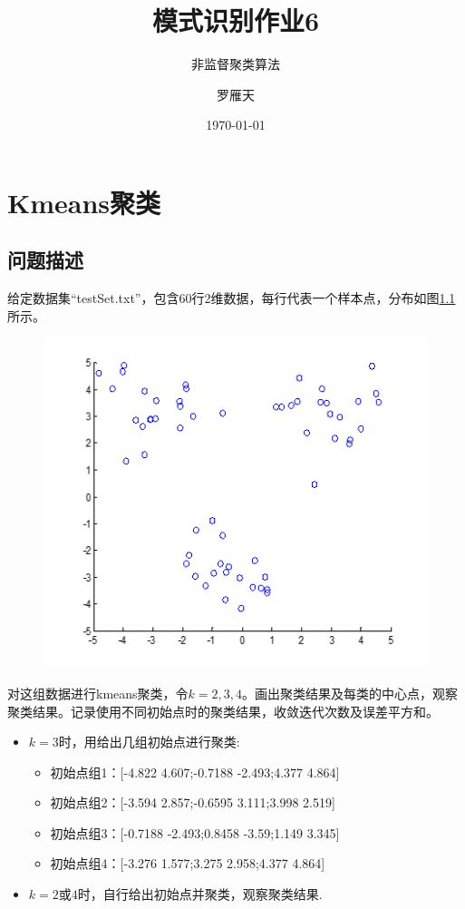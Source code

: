 \documentclass[cn]{elegantbook}
\title{模式识别作业6}
\subtitle{非监督聚类算法}
\author{罗雁天}
\institute{清华大学电子系}
\date{\today}
\begin{document}
\maketitle
\tableofcontents
\mainmatter
\hypersetup{pageanchor=true}
\chapter{Kmeans聚类}
\section{问题描述}
给定数据集``testSet.txt''，包含60行2维数据，每行代表一个样本点，分布如图\ref{intro}所示。
\begin{figure}[!h]
	\centering
	\includegraphics[width=\linewidth]{intro}
	\caption{\label{intro}}
\end{figure}

对这组数据进行kmeans聚类，令$k=2,3,4$。画出聚类结果及每类的中心点，观察聚类结果。记录使用不同初始点时的聚类结果，收敛迭代次数及误差平方和。
\begin{itemize}
	\item $k=3$时，用给出几组初始点进行聚类:
	\begin{itemize}
		\item 初始点组1：[-4.822 4.607;-0.7188 -2.493;4.377 4.864]
		\item 初始点组2：[-3.594 2.857;-0.6595 3.111;3.998 2.519]
		\item 初始点组3：[-0.7188 -2.493;0.8458 -3.59;1.149 3.345]
		\item 初始点组4：[-3.276 1.577;3.275 2.958;4.377 4.864]
	\end{itemize}
	\item $k=2\mbox{或}4$时，自行给出初始点并聚类，观察聚类结果.
\end{itemize}
\end{document}
